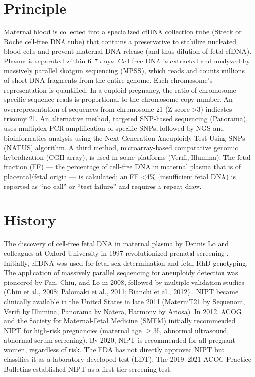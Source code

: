\section*{Principle}
Maternal blood is collected into a specialized cfDNA collection tube (Streck or Roche cell-free DNA tube) that contains a preservative to stabilize nucleated blood cells and prevent maternal DNA release (and thus dilution of fetal cfDNA). Plasma is separated within 6--7 days. Cell-free DNA is extracted and analyzed by massively parallel shotgun sequencing (MPSS), which reads and counts millions of short DNA fragments from the entire genome. Each chromosome's representation is quantified. In a euploid pregnancy, the ratio of chromosome-specific sequence reads is proportional to the chromosome copy number. An overrepresentation of sequences from chromosome 21 (Z-score >3) indicates trisomy 21. An alternative method, targeted SNP-based sequencing (Panorama), uses multiplex PCR amplification of specific SNPs, followed by NGS and bioinformatics analysis using the Next-Generation Aneuploidy Test Using SNPs (NATUS) algorithm. A third method, microarray-based comparative genomic hybridization (CGH-array), is used in some platforms (Verifi, Illumina). The fetal fraction (FF) --- the percentage of cell-free DNA in maternal plasma that is of placental/fetal origin --- is calculated; an FF <4\% (insufficient fetal DNA) is reported as ``no call'' or ``test failure'' and requires a repeat draw.

\section*{History}
The discovery of cell-free fetal DNA in maternal plasma by Dennis Lo and colleagues at Oxford University in 1997 revolutionized prenatal screening \cite{lo1997presence}. Initially, cffDNA was used for fetal sex determination and fetal RhD genotyping. The application of massively parallel sequencing for aneuploidy detection was pioneered by Fan, Chiu, and Lo in 2008, followed by multiple validation studies (Chiu et al., 2008; Palomaki et al., 2011; Bianchi et al., 2012) \cite{palomaki2011dnasequencing,bianchi2018sequencing}. NIPT became clinically available in the United States in late 2011 (MaterniT21 by Sequenom, Verifi by Illumina, Panorama by Natera, Harmony by Ariosa). In 2012, ACOG and the Society for Maternal-Fetal Medicine (SMFM) initially recommended NIPT for high-risk pregnancies (maternal age $\geq$35, abnormal ultrasound, abnormal serum screening). By 2020, NIPT is recommended for all pregnant women, regardless of risk. The FDA has not directly approved NIPT but classifies it as a laboratory-developed test (LDT). The 2019--2021 ACOG Practice Bulletins established NIPT as a first-tier screening test.

